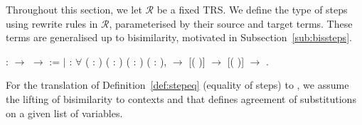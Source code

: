 Throughout this section, we let $\mathcal{R}$ be a fixed TRS. We
define the type of steps using rewrite rules in $\mathcal{R}$,
parameterised by their source and target terms. These terms are generalised up
to bisimilarity, motivated in Subsection~\ref{sub:bissteps}.
\begin{singlespace}
\begin{coqdoccode}
\coqdocnoindent
{}  :
 \ensuremath{\rightarrow}
 \ensuremath{\rightarrow}
 :=\coqdoceol
\coqdocindent{1.00em}
\ensuremath{|}  :
\ensuremath{\forall} (  :
) (\coqdocvar{$\rho$} :
) ( :
) (\coqdocvar{$\sigma$} :
),\coqdoceol
\coqdocindent{6.50em} \coqdocvariable{$\rho$}
 \ensuremath{\rightarrow}\coqdoceol
\coqdocindent{6.50em}
[(
\coqdocvariable{$\rho$})\coqdocvariable{$^\sigma$}]  
\ensuremath{\rightarrow}\coqdoceol
\coqdocindent{6.50em}
[(
\coqdocvariable{$\rho$})\coqdocvariable{$^\sigma$}]  
\ensuremath{\rightarrow}\coqdoceol
\coqdocindent{6.50em}
 
.\coqdoceol
\end{coqdoccode}
\end{singlespace}
For the translation of Definition~\ref{def:stepeq} (equality of steps)
to \Coq, we assume the lifting of bisimilarity to contexts and that
defines agreement of substitutions on a given list of variables.
